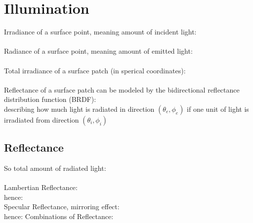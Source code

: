 \documentclass[a4paper,12pt,pdftex]{scrreprt}
\begin{document}
	\chapter{Illumination} %
	\label{cha:illumination}
	Irradiance of a surface point, meaning amount of incident light:\\
	\\
	Radiance of a surface point, meaning amount of emitted light:\\
	\\
	Total irradiance of a surface patch (in sperical coordinates):\\
	\\
	Reflectance of a surface patch can be modeled by the bidirectional reflectance distribution function (BRDF):\\
	 describing how much light is radiated in direction $(\theta_{e},\phi_{e})$ if one unit of light is irradiated from direction $(\theta_{i},\phi_{i})$

	\section{Reflectance} %
	\label{sec:reflectance}
	So total amount of radiated light:\\
	\\
	Lambertian Reflectance:\\
	 hence: \\
	Specular Reflectance, mirroring effect:\\
	 hence:
	Combinations of Reflectance:\\
\end{document}
